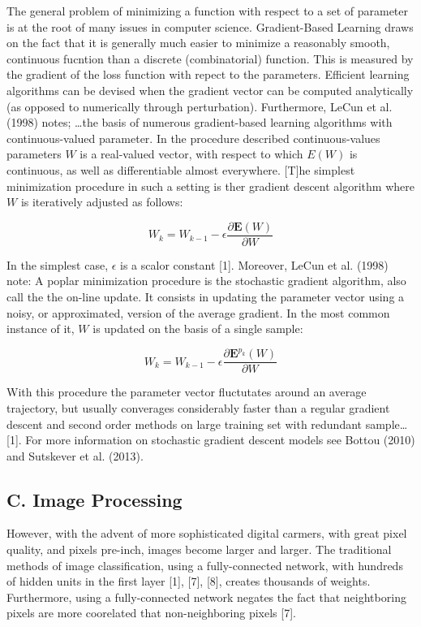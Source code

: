 \documentclass[conference,final,]{IEEEtran}
\begin{document}
The general problem of minimizing a function with respect to a set of
parameter is at the root of many issues in computer science.
Gradient-Based Learning draws on the fact that it is generally much
easier to minimize a reasonably smooth, continuous fucntion than a
discrete (combinatorial) function. This is measured by the gradient of
the loss function with repect to the parameters. Efficient learning
algorithms can be devised when the gradient vector can be computed
analytically (as opposed to numerically through perturbation).
Furthermore, LeCun et al. (1998) notes; \ldots{}the basis of numerous
gradient-based learning algorithms with continuous-valued parameter. In
the procedure described continuous-values parameters \(W\) is a
real-valued vector, with respect to which \(E(W)\) is continuous, as
well as differentiable almost everywhere. {[}T{]}he simplest
minimization procedure in such a setting is ther gradient descent
algorithm where \(W\) is iteratively adjusted as follows:

\begin{equation}
    W_k =  W_{k-1}-\epsilon\frac{\partial \mathbf{E}(W)}{\partial W}
\end{equation}

In the simplest case, \(\epsilon\) is a scalor constant {[}1{]}.
Moreover, LeCun et al. (1998) note: A poplar minimization procedure is
the stochastic gradient algorithm, also call the the on-line update. It
consists in updating the parameter vector using a noisy, or
approximated, version of the average gradient. In the most common
instance of it, \(W\) is updated on the basis of a single sample:

\begin{equation}
    W_k =  W_{k-1}-\epsilon\frac{\partial \mathbf{E}^{p_k}(W)}{\partial W}
\end{equation}

With this procedure the parameter vector fluctutates around an average
trajectory, but usually converages considerably faster than a regular
gradient descent and second order methods on large training set with
redundant sample\ldots{}{[}1{]}. For more information on stochastic
gradient descent models see Bottou (2010) and Sutskever et al. (2013).

\subsection{C. Image Processing}\label{c.-image-processing}

However, with the advent of more sophisticated digital carmers, with
great pixel quality, and pixels pre-inch, images become larger and
larger. The traditional methods of image classification, using a
fully-connected network, with hundreds of hidden units in the first
layer {[}1{]}, {[}7{]}, {[}8{]}, creates thousands of weights.
Furthermore, using a fully-connected network negates the fact that
neightboring pixels are more coorelated that non-neighboring pixels
{[}7{]}.
\end{document}
